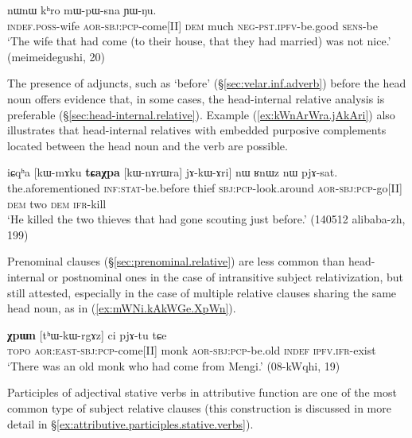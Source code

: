\begin{exe}
\ex \label{ex:tArZaB.jAkWGe}
 nɯnɯ kʰro mɯ-pɯ-sna ɲɯ-ŋu.  \\
\textsc{indef}.\textsc{poss}-wife \textsc{aor}-\textsc{sbj}:\textsc{pcp}-come[II] \textsc{dem} much \textsc{neg}-\textsc{pst}.\textsc{ipfv}-be.good \textsc{sens}-be \\
\glt `The wife that had come (to their house, that they had married) was not nice.' (meimeidegushi, 20)
\end{exe} 

The presence of adjuncts, such as  `before' (§\ref{sec:velar.inf.adverb}) before the head noun offers evidence that, in some cases, the head-internal relative analysis is preferable (§\ref{sec:head-internal.relative}). Example (\ref{ex:kWnArWra.jAkAri}) also illustrates that head-internal relatives with embedded purposive complements located between the head noun and the verb are possible.

\begin{exe}
\ex \label{ex:kWnArWra.jAkAri}
\gll iɕqʰa [kɯ-mɤku \textbf{tɕaχpa} [kɯ-nɤrɯra] jɤ-kɯ-ɤri] nɯ ʁnɯz nɯ pjɤ-sat. \\
the.aforementioned \textsc{inf}:\textsc{stat}-be.before thief \textsc{sbj}:\textsc{pcp}-look.around \textsc{aor}-\textsc{sbj}:\textsc{pcp}-go[II]  \textsc{dem} two \textsc{dem} \textsc{ifr}-kill \\
\glt `He killed the two thieves that had gone scouting just before.' (140512 alibaba-zh, 199)
\end{exe} 

Prenominal clauses (§\ref{sec:prenominal.relative}) are less common than head-internal or postnominal ones in the case of intransitive subject relativization, but still attested, especially in the case of multiple relative clauses sharing the same head noun, as in (\ref{ex:mWNi.kAkWGe.XpWn}).
 
\begin{exe}
\ex \label{ex:mWNi.kAkWGe.XpWn}
\gll 	 [mɯŋi kɤ-kɯ-ɣe] \textbf{χpɯn} [tʰɯ-kɯ-rgɤz] ci pjɤ-tu tɕe \\
\textsc{topo} \textsc{aor}:\textsc{east}-\textsc{sbj}:\textsc{pcp}-come[II] monk \textsc{aor}-\textsc{sbj}:\textsc{pcp}-be.old \textsc{indef} \textsc{ipfv}.\textsc{ifr}-exist \\
\glt `There was an old monk who had come from Mengi.' (08-kWqhi, 19)
\end{exe} 

Participles of adjectival stative verbs in attributive function are one of the most common type of subject relative clauses (this construction is discussed in more detail in §\ref{ex:attributive.participles.stative.verbs}).

